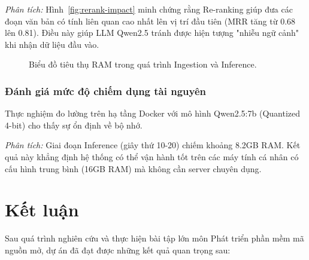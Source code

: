 ﻿\documentclass[10pt, conference, a4paper, compsocconf]{IEEEtran}
\begin{document}
\textit{Phân tích:} Hình~\ref{fig:rerank-impact} minh chứng rằng Re-ranking giúp đưa các đoạn văn bản có tính liên quan cao nhất lên vị trí đầu tiên (MRR tăng từ 0.68 lên 0.81). Điều này giúp LLM Qwen2.5 tránh được hiện tượng "nhiễu ngữ cảnh" khi nhận dữ liệu đầu vào.

\begin{figure}[H]
\centering
{}
\caption{Biểu đồ tiêu thụ RAM trong quá trình Ingestion và Inference.}
\label{fig:resource-usage}
\end{figure}
\subsubsection{Đánh giá mức độ chiếm dụng tài nguyên}
Thực nghiệm đo lường trên hạ tầng Docker với mô hình Qwen2.5:7b (Quantized 4-bit) cho thấy sự ổn định về bộ nhớ.

\textit{Phân tích:} Giai đoạn Inference (giây thứ 10-20) chiếm khoảng 8.2GB RAM. Kết quả này khẳng định hệ thống có thể vận hành tốt trên các máy tính cá nhân có cấu hình trung bình (16GB RAM) mà không cần server chuyên dụng.

\section{Kết luận}

Sau quá trình nghiên cứu và thực hiện bài tập lớn môn Phát triển phần mềm mã nguồn mở, dự án đã đạt được những kết quả quan trọng sau:
\end{document}

